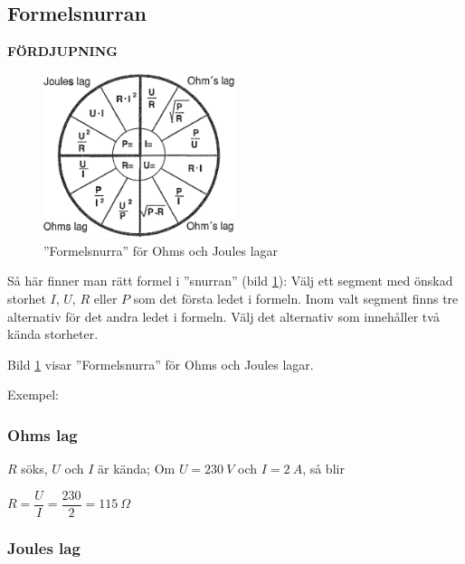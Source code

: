 \subsection{Formelsnurran}
\textbf{FÖRDJUPNING}

\begin{figure}[ht]
\begin{center}
  \includegraphics[width=0.5\textwidth]{images/cropped_pdfs/bild_2_1-04.pdf}
  \caption{''Formelsnurra'' för Ohms och Joules lagar}
  \label{fig:BildII1-4}
\end{center}
\end{figure}

Så här finner man rätt formel i ''snurran'' (bild \ref{fig:BildII1-4}):
Välj ett segment med önskad storhet \(I\), \(U\), \(R\) eller \(P\) som det
första ledet i formeln.
Inom valt segment finns tre alternativ för det andra ledet i formeln.
Välj det alternativ som innehåller två kända storheter.

Bild \ref{fig:BildII1-4} visar ''Formelsnurra'' för Ohms och Joules lagar.

Exempel:

\subsubsection{Ohms lag}

\(R\) söks, \(U\) och \(I\) är kända;
Om \(U = 230\ V\) och \(I = 2\ A\), så blir

\(R=\dfrac{U}{I}=\dfrac{230}{2}=115\ \Omega\)

\subsubsection{Joules lag}

